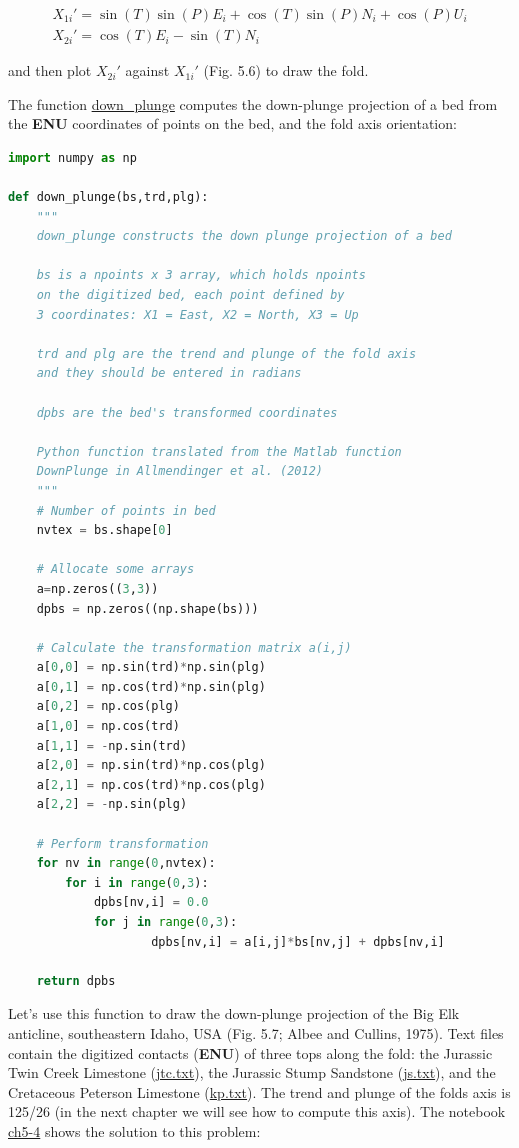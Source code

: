 \documentclass[a4paper , 12pt]{book}
\begin{document}
\begin{equation}
    \begin{gathered}
        X_{1i}'=\sin(T)\sin(P)E_i+\cos(T)\sin(P)N_i+\cos(P)U_i \\
        X_{2i}'=\cos(T)E_i-\sin(T)N_i
    \end{gathered}
\end{equation}

and then plot $X_{2i}'$ against $X_{1i}'$ (Fig. 5.6) to draw the fold.

The function \href{https://github.com/nfcd/compGeo/blob/master/source/functions/down_plunge.py}{down\_plunge} computes the down-plunge projection of a bed from the \textbf{ENU} coordinates of points on the bed, and the fold axis orientation:

\begin{lstlisting}[language=Python, frame=single]
import numpy as np

def down_plunge(bs,trd,plg):
	"""
	down_plunge constructs the down plunge projection of a bed
	
	bs is a npoints x 3 array, which holds npoints
	on the digitized bed, each point defined by
	3 coordinates: X1 = East, X2 = North, X3 = Up
	
	trd and plg are the trend and plunge of the fold axis
	and they should be entered in radians
	
	dpbs are the bed's transformed coordinates
	
	Python function translated from the Matlab function
	DownPlunge in Allmendinger et al. (2012)
	"""
	# Number of points in bed
	nvtex = bs.shape[0]
	
	# Allocate some arrays
	a=np.zeros((3,3))
	dpbs = np.zeros((np.shape(bs)))
	
	# Calculate the transformation matrix a(i,j)
	a[0,0] = np.sin(trd)*np.sin(plg)
	a[0,1] = np.cos(trd)*np.sin(plg)
	a[0,2] = np.cos(plg)
	a[1,0] = np.cos(trd)
	a[1,1] = -np.sin(trd)
	a[2,0] = np.sin(trd)*np.cos(plg)
	a[2,1] = np.cos(trd)*np.cos(plg)
	a[2,2] = -np.sin(plg)
	
	# Perform transformation
	for nv in range(0,nvtex):
		for i in range(0,3):
			dpbs[nv,i] = 0.0
			for j in range(0,3):
					dpbs[nv,i] = a[i,j]*bs[nv,j] + dpbs[nv,i]
	
	return dpbs
\end{lstlisting}

Let's use this function to draw the down-plunge projection of the Big Elk anticline, southeastern Idaho, USA (Fig. 5.7; Albee and Cullins, 1975). Text files contain the digitized contacts (\textbf{ENU}) of three tops along the fold: the Jurassic Twin Creek Limestone (\href{https://github.com/nfcd/compGeo/blob/master/source/data/ch5-4/jtc.txt}{jtc.txt}), the Jurassic Stump Sandstone (\href{https://github.com/nfcd/compGeo/blob/master/source/data/ch5-4/js.txt}{js.txt}), and the Cretaceous Peterson Limestone (\href{https://github.com/nfcd/compGeo/blob/master/source/data/ch5-4/kp.txt}{kp.txt}). The trend and plunge of the folds axis is 125/26 (in the next chapter we will see how to compute this axis). The notebook \href{https://github.com/nfcd/compGeo/blob/master/source/notebooks/ch5-4.ipynb}{ch5-4} shows the solution to this problem:
\end{document}
